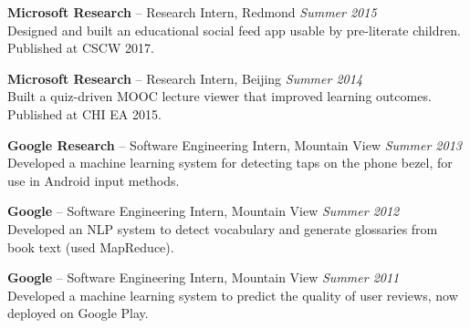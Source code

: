 \documentclass[margin,line]{resume}
\begin{document}
\begin{resume}
\textbf{Microsoft Research} -- Research Intern, Redmond \hfill \textsl{Summer 2015}\\
Designed and built an educational social feed app usable by pre-literate children. Published at CSCW 2017.

\textbf{Microsoft Research} -- Research Intern, Beijing \hfill \textsl{Summer 2014}\\
Built a quiz-driven MOOC lecture viewer that improved learning outcomes. Published at CHI EA 2015. %

\textbf{Google Research} -- Software Engineering Intern, Mountain View \hfill \textsl{Summer 2013}\\
Developed a machine learning system for detecting taps on the phone bezel, for use in Android input methods.

\textbf{Google} -- Software Engineering Intern, Mountain View \hfill \textsl{Summer 2012}\\
Developed an NLP system to detect vocabulary and generate glossaries from book text (used MapReduce). %

\textbf{Google} -- Software Engineering Intern, Mountain View \hfill \textsl{Summer 2011}\\
Developed a machine learning system to predict the quality of user reviews, now deployed on Google Play.


\end{resume}
\end{document}
